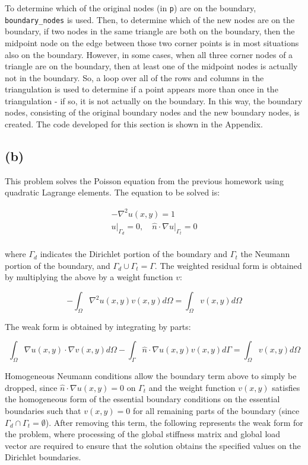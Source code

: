\documentclass[10pt]{article}
\newcommand{\beq}{\begin{equation}}
\newcommand{\eeq}{\end{equation}}
\newcommand{\beqa}{\begin{equation}\begin{aligned}}
\newcommand{\eeqa}{\end{aligned}\end{equation}}
\begin{document}
To determine which of the original nodes (in {\tt p}) are on the boundary, {\tt boundary\_nodes} is used. Then, to determine which of the new nodes are on the boundary, if two nodes in the same triangle are both on the boundary, then the midpoint node on the edge between those two corner points is in most situations also on the boundary. However, in some cases, when all three corner nodes of a triangle are on the boundary, then at least one of the midpoint nodes is actually not in the boundary. So, a loop over all of the rows and columns in the triangulation is used to determine if a point appears more than once in the triangulation - if so, it is not actually on the boundary. In this way, the boundary nodes, consisting of the original boundary nodes and the new boundary nodes, is created. The code developed for this section is shown in the Appendix.

\subsection{(b)}

This problem solves the Poisson equation from the previous homework using quadratic Lagrange elements. The equation to be solved is:

\beqa
-\nabla^2u(x,y)=1\\
u\rvert_{\Gamma_d}=0,\quad \hat{n}\cdot\nabla u\rvert_{\Gamma_t}=0\\
\eeqa

where \(\Gamma_d\) indicates the Dirichlet portion of the boundary and \(\Gamma_t\) the Neumann portion of the boundary, and \(\Gamma_d\cup\Gamma_t=\Gamma\). The weighted residual form is obtained by multiplying the above by a weight function \(v\):

\beq
-\int_\Omega \nabla^2u(x,y)v(x,y)d\Omega=\int_\Omega v(x,y)d\Omega
\eeq

The weak form is obtained by integrating by parts:

\beq
\int_\Omega \nabla u(x,y)\cdot\nabla v(x,y)d\Omega-\int_\Gamma\hat{n}\cdot\nabla u(x,y)v(x,y)d\Gamma=\int_\Omega v(x,y)d\Omega
\eeq

Homogeneous Neumann conditions allow the boundary term above to simply be dropped, since \(\hat{n}\cdot\nabla u(x,y)=0\) on \(\Gamma_t\) and the weight function \(v(x,y)\) satisfies the homogeneous form of the essential boundary conditions on the essential boundaries such that \(v(x,y)=0\) for all remaining parts of the boundary (since \(\Gamma_d\cap\Gamma_t=\emptyset\)). After removing this term, the following represents the weak form for the problem, where processing of the global stiffness matrix and global load vector are required to ensure that the solution obtains the specified values on the Dirichlet boundaries.
\end{document}
